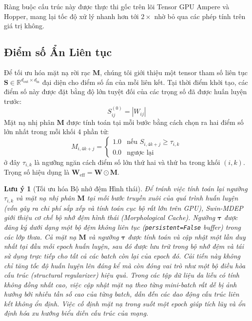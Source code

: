 \documentclass[11pt]{article}
\newtheorem{remark}{Lưu ý}
\newcommand{\R}{\mathbb{R}}
\begin{document}
Ràng buộc cấu trúc này được thực thi gốc trên lõi Tensor GPU Ampere và Hopper, mang lại tốc độ xử lý nhanh hơn tới $2\times$ nhờ bỏ qua các phép tính trên giá trị không.

\subsection{Điểm số Ẩn Liên tục}\label{subsec:scores}

Để tối ưu hóa mặt nạ rời rạc $\bm{M}$, chúng tôi giới thiệu một tensor tham số liên tục $\bm{S} \in \R^{d_{\text{out}} \times d_{\text{in}}}$ đại diện cho điểm số ẩn của mỗi liên kết. Tại thời điểm khởi tạo, các điểm số này được đặt bằng độ lớn tuyệt đối của các trọng số đã được huấn luyện trước:
\begin{equation}\label{eq:score_init}
    S_{ij}^{(0)} = |W_{ij}|
\end{equation}
Mặt nạ nhị phân $\bm{M}$ được tính toán tại mỗi bước bằng cách chọn ra hai điểm số lớn nhất trong mỗi khối 4 phần tử:
\begin{equation}\label{eq:mask_gen}
    M_{i, 4k+j} = \begin{cases}
        1.0 & \text{nếu } S_{i, 4k+j} \ge \tau_{i, k} \\
        0.0 & \text{ngược lại}
    \end{cases}
\end{equation}
ở đây $\tau_{i, k}$ là ngưỡng ngăn cách điểm số lớn thứ hai và thứ ba trong khối $(i, k)$. Trọng số hiệu dụng là $\bm{W}_{\text{eff}} = \bm{W} \odot \bm{M}$.

\begin{remark}[Tối ưu hóa Bộ nhớ đệm Hình thái]
Để tránh việc tính toán lại ngưỡng $\tau_{i, k}$ và mặt nạ nhị phân $\bm{M}$ tại mỗi bước truyền xuôi của quá trình huấn luyện (vốn gây ra chi phí sắp xếp và tính toán cục bộ rất lớn trên GPU), Swin-MDEP giới thiệu cơ chế bộ nhớ đệm hình thái (Morphological Cache). Ngưỡng $\bm{\tau}$ được đăng ký dưới dạng một bộ đệm không liên tục (\texttt{persistent=False} buffer) trong các lớp thưa. Cả mặt nạ $\bm{M}$ và ngưỡng $\bm{\tau}$ được tính toán và cập nhật một lần duy nhất tại đầu mỗi epoch huấn luyện, sau đó được lưu trữ trong bộ nhớ đệm và tái sử dụng trực tiếp cho tất cả các batch còn lại của epoch đó. Cải tiến này không chỉ tăng tốc độ huấn luyện lên đáng kể mà còn đóng vai trò như một bộ điều hòa cấu trúc (structural regularizer) hiệu quả. Trong các tập dữ liệu da liễu có tính không đồng nhất cao, việc cập nhật mặt nạ theo từng mini-batch rất dễ bị ảnh hưởng bởi nhiễu tần số cao của từng batch, dẫn đến các dao động cấu trúc liên kết không ổn định. Việc cố định mặt nạ trong suốt một epoch giúp tích lũy và ổn định hóa xu hướng biểu diễn cấu trúc của mạng.
\end{remark}
\end{document}
